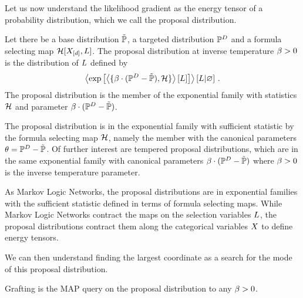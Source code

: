 
Let us now understand the likelihood gradient as the energy tensor of a probability distribution, which we call the proposal distribution.

\begin{definition}
	Let there be a base distribution $\tilde{\mathbb{P}}$, a targeted distribution $\mathbb{P}^{D}$ and a formula selecting map $\mathcal{H}[X_{[d]}, L]$.
	The proposal distribution at inverse temperature $\beta>0$ is the distribution of $L$ defined by
	\begin{align*}
		\left\langle \mathrm{exp}\left[\left\langle \{\beta\cdot(\mathbb{P}^{D}-\tilde{\mathbb{P}}),\mathcal{H}\}\right\rangle \left[ L \right]\right] \right\rangle \left[ L | \varnothing \right] \, . 
	\end{align*}
	The proposal distribution is the member of the exponential family with statistics $\mathcal{H}$ and parameter $\beta\cdot(\mathbb{P}^{D}-\tilde{\mathbb{P}})$.
\end{definition}


The proposal distribution is in the exponential family with sufficient statistic by the formula selecting map $\mathcal{H}$, namely the member with the canonical parameters $\theta=\mathbb{P}^{D}-\tilde{\mathbb{P}}$.
Of further interest are tempered proposal distributions, which are in the same exponential family with canonical parameters $\beta\cdot(\mathbb{P}^{D}-\tilde{\mathbb{P}})$ where $\beta>0$ is the inverse temperature parameter.

As Markov Logic Networks, the proposal distributions are in exponential families with the sufficient statistic defined in terms of formula selecting maps.
While Markov Logic Networks contract the maps on the selection variables $L$, the proposal distributions contract them along the categorical variables $X$ to define energy tensors.





We can then understand finding the largest coordinate as a search for the mode of this proposal distribution.
\begin{theorem}
	Grafting is the MAP query on the proposal distribution to any $\beta>0$.
\end{theorem}

